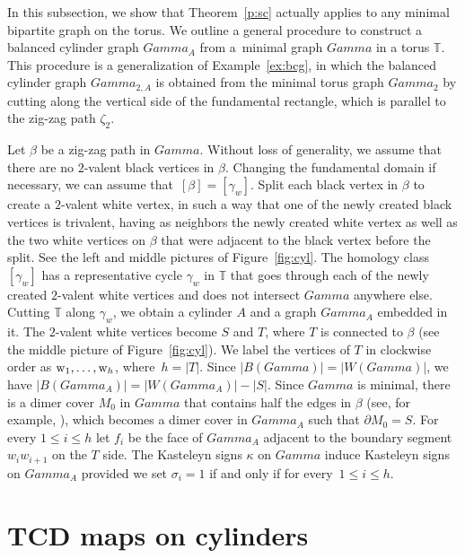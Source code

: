 \documentclass[10pt,a4paper]{amsart}
\numberwithin{equation}{section}
\newcommand{\T}{{\mathbb T}}
\newcommand{\A}{{\mathbb A}}
\newcommand{\w}{{\rm w}}
\def\A{A}
\def\Gamma{Gamma}
\begin{document}
In this subsection, we show that Theorem~\ref{p:sc} actually applies to any minimal bipartite graph on the torus. We outline a general procedure to construct a balanced cylinder graph $\Gamma_\A$ from a~minimal graph $\Gamma$ in a torus $\T$. This procedure is a generalization of Example~\ref{ex:bcg}, in which the balanced cylinder graph $\Gamma_{2,\A}$ is obtained from the minimal torus graph $\Gamma_2$ by cutting along the vertical side of the fundamental rectangle, which is parallel to the zig-zag path $\zeta_2$.
	
	Let $\beta$ be a zig-zag path in $\Gamma$. Without loss of generality, we assume that there are no $2$-valent black vertices in $\beta$. Changing the fundamental domain if necessary, we can assume that~${[\beta]=[\gamma_w]}$. Split each black vertex in $\beta$ to create a $2$-valent white vertex, in such a way that one of the newly created black vertices is trivalent, having as neighbors the newly created white vertex as well as the two white vertices on $\beta$ that were adjacent to the black vertex before the split. See the left and middle pictures of Figure~\ref{fig:cyl}. The homology class $[\gamma_w]$ has a representative cycle $\gamma_w$ in $\T$ that goes through each of the newly created $2$-valent white vertices and does not intersect $\Gamma$ anywhere else. Cutting $\T$ along $\gamma_w$, we obtain a cylinder $\A$ and a graph $\Gamma_\A$ embedded in it. The $2$-valent white vertices become $S$ and $T$, where $T$ is connected to $\beta$ (see the middle picture of Figure~\ref{fig:cyl}). We label the vertices of $T$ in clockwise order as $\w_1,\dots,\w_h$, where~${h=|T|}$. Since $|B(\Gamma)|=|W(\Gamma)|$, we have $|B(\Gamma_\A)|=|W(\Gamma_\A)|-|S|$. Since $\Gamma$ is minimal, there is a dimer cover $M_0$ in $\Gamma$ that contains half the edges in $\beta$ (see, for example, \cite[Theorem~3.12]{GK13}), which becomes a dimer cover in $\Gamma_\A$ such that $\partial M_0=S$. For every $1\leq i\leq h$ let $f_i$ be the face of $\Gamma_\A$ adjacent to the boundary segment $w_i w_{i+1}$ on the $T$ side. The Kasteleyn signs $\kappa$ on $\Gamma$ induce Kasteleyn signs on $\Gamma_\A$ provided we set $\sigma_i=1$ if and only if  for every~${1\leq i\leq h}$.
	
\section{TCD maps on cylinders}
	\label{sec:tcdtorus}
	
\end{document}
